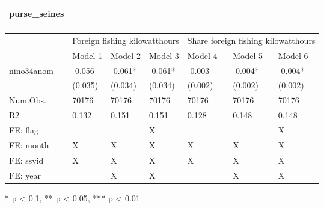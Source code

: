 \captionsetup[table]{labelformat=empty,skip=1pt}
\begin{longtable}{lllllll}
\caption*{
\large purse\_seines\\ 
\small \\ 
} \\ 
\toprule
& \multicolumn{3}{c}{Foreign fishing kilowatthours} & \multicolumn{3}{c}{Share foreign fishing kilowatthours} \\ 
 \cmidrule(lr){2-4}\cmidrule(lr){5-7}
  & Model 1 & Model 2 & Model 3 & Model 4 & Model 5 & Model 6 \\ 
\midrule
nino34anom & -0.056 & -0.061* & -0.061* & -0.003 & -0.004* & -0.004* \\ 
 & (0.035) & (0.034) & (0.034) & (0.002) & (0.002) & (0.002) \\ 
Num.Obs. & 70176 & 70176 & 70176 & 70176 & 70176 & 70176 \\ 
R2 & 0.132 & 0.151 & 0.151 & 0.128 & 0.148 & 0.148 \\ 
FE:  flag &  &  & X &  &  & X \\ 
FE:  month & X & X & X & X & X & X \\ 
FE:  ssvid & X & X & X & X & X & X \\ 
FE:  year &  & X & X &  & X & X \\ 
\bottomrule
\end{longtable}
\begin{minipage}{\linewidth}
* p < 0.1, ** p < 0.05, *** p < 0.01\\ 
\end{minipage}

